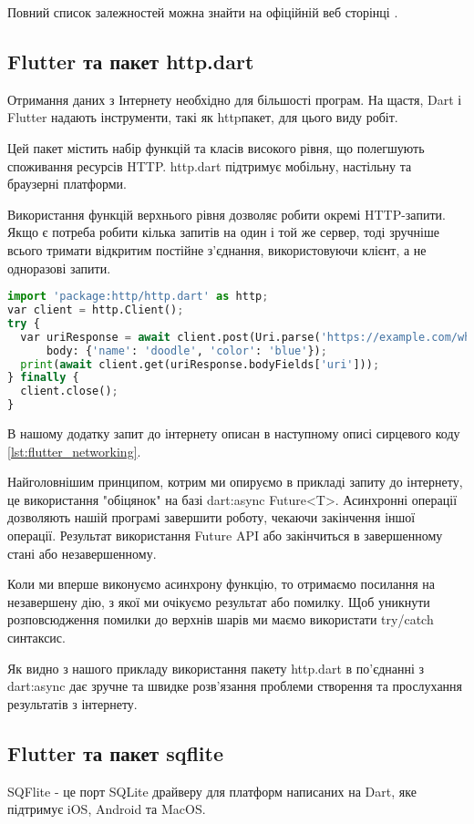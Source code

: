 Повний список залежностей можна знайти на офіційній веб сторінці \cite{flutter_cli}.

\subsection{Flutter та пакет http.dart}
\label{subsec:flutter_http_dart_theory}
Отримання даних з Інтернету необхідно для більшості програм.
На щастя, Dart і Flutter надають інструменти, такі як httpпакет, для цього виду робіт.

Цей пакет містить набір функцій та класів високого рівня, що полегшують споживання ресурсів HTTP.
http.dart підтримує мобільну, настільну та браузерні платформи.

Використання функцій верхнього рівня дозволяє робити окремі HTTP-запити.
Якщо є потреба робити кілька запитів на один і той же сервер, тоді зручніше всього тримати відкритим постійне з’єднання,
використовуючи клієнт, а не одноразові запити.

\begin{lstlisting}[style=light, language=Python,label={lst:flutter_pub},caption=Flutter Dependency Resolution]
import 'package:http/http.dart' as http;
var client = http.Client();
try {
  var uriResponse = await client.post(Uri.parse('https://example.com/whatsit/create'),
      body: {'name': 'doodle', 'color': 'blue'});
  print(await client.get(uriResponse.bodyFields['uri']));
} finally {
  client.close();
}
\end{lstlisting}

В нашому додатку запит до інтернету описан в наступному описі сирцевого коду \ref{lst:flutter_networking}.

Найголовнішим принципом, котрим ми опируємо в прикладі запиту до інтернету, це використання "обіцянок" на базі dart:async Future<T>.
Асинхронні операції дозволяють нашій програмі завершити роботу, чекаючи закінчення іншої операції.
Результат використання Future API або закінчиться в завершенному стані або незавершенному.

Коли ми вперше виконуємо асинхрону функцію, то отримаємо посилання на незавершену дію, з якої ми очікуємо результат або помилку.
Щоб уникнути розповсюдження помилки до верхнів шарів ми маємо використати try/catch синтаксис.

Як видно з нашого прикладу використання пакету http.dart в по'єднанні з dart:async дає зручне
та швидке розв'язання проблеми створення та прослухання результатів з інтернету.

\subsection{Flutter та пакет sqflite}
\label{subsec:flutter_sqflite_theory}
SQFlite - це порт SQLite драйверу для платформ написаних на Dart, яке підтримує iOS, Android та MacOS.

